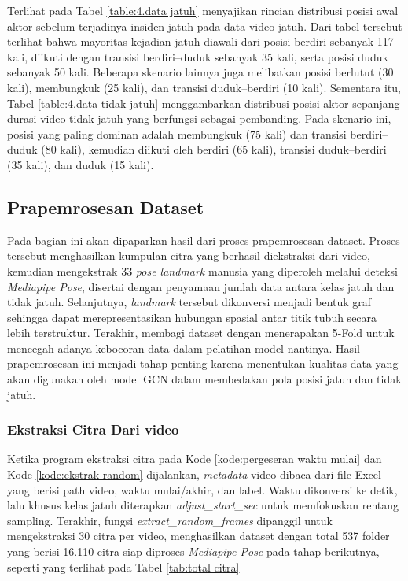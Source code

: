 
Terlihat pada Tabel \ref{table:4.data jatuh} menyajikan rincian distribusi posisi awal aktor sebelum terjadinya insiden jatuh pada data video jatuh. Dari tabel tersebut terlihat bahwa mayoritas kejadian jatuh diawali dari posisi berdiri sebanyak 117 kali, diikuti dengan transisi berdiri–duduk sebanyak 35 kali, serta posisi duduk sebanyak 50 kali. Beberapa skenario lainnya juga melibatkan posisi berlutut (30 kali), membungkuk (25 kali), dan transisi duduk–berdiri (10 kali). Sementara itu, Tabel \ref{table:4.data tidak jatuh} menggambarkan distribusi posisi aktor sepanjang durasi video tidak jatuh yang berfungsi sebagai pembanding. Pada skenario ini, posisi yang paling dominan adalah membungkuk (75 kali) dan transisi berdiri–duduk (80 kali), kemudian diikuti oleh berdiri (65 kali), transisi duduk–berdiri (35 kali), dan duduk (15 kali).

\subsection{Prapemrosesan Dataset} \label{IV.prapemrosesan}
Pada bagian ini akan dipaparkan hasil dari proses prapemrosesan dataset. Proses tersebut menghasilkan kumpulan citra yang berhasil diekstraksi dari video, kemudian mengekstrak 33 \textit{pose landmark} manusia yang diperoleh melalui deteksi \textit{Mediapipe Pose}, disertai dengan penyamaan jumlah data antara kelas jatuh dan tidak jatuh. Selanjutnya, \textit{landmark} tersebut dikonversi menjadi bentuk graf sehingga dapat merepresentasikan hubungan spasial antar titik tubuh secara lebih terstruktur. Terakhir, membagi dataset dengan menerapakan 5-Fold untuk mencegah adanya kebocoran data dalam pelatihan model nantinya. Hasil prapemrosesan ini menjadi tahap penting karena menentukan kualitas data yang akan digunakan oleh model GCN dalam membedakan pola posisi jatuh dan tidak jatuh. \par

\subsubsection{Ekstraksi Citra Dari video} \label{IV.ekstrak frame}

Ketika program ekstraksi citra pada Kode \ref{kode:pergeseran waktu mulai} dan Kode \ref{kode:ekstrak random} dijalankan, \textit{metadata} video dibaca dari file Excel yang berisi path video, waktu mulai/akhir, dan label. Waktu dikonversi ke detik, lalu khusus kelas jatuh diterapkan \textit{adjust\_start\_sec} untuk memfokuskan rentang sampling. Terakhir, fungsi \textit{extract\_random\_frames} dipanggil untuk mengekstraksi 30 citra per video, menghasilkan dataset dengan total 537 folder yang berisi 16.110 citra siap diproses \textit{Mediapipe Pose} pada tahap berikutnya, seperti yang terlihat pada Tabel \ref{tab:total citra} \par

